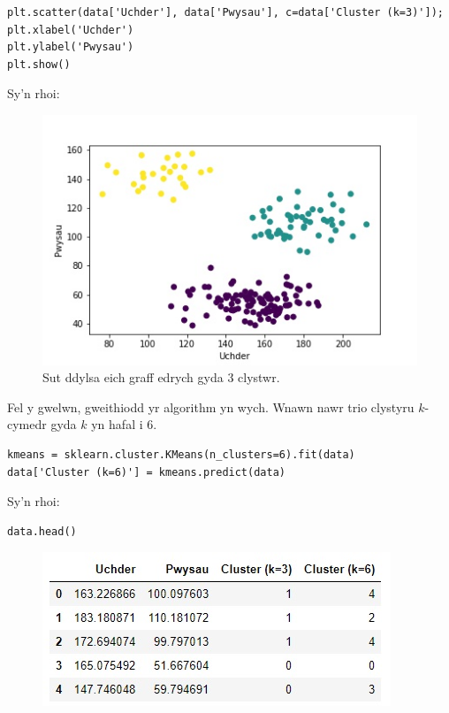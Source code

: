 \begin{verbatim}
plt.scatter(data['Uchder'], data['Pwysau'], c=data['Cluster (k=3)']);
plt.xlabel('Uchder')
plt.ylabel('Pwysau')
plt.show()
\end{verbatim}

Sy'n rhoi:

\begin{figure}[H]
\begin{center}
\includegraphics[width=0.7\linewidth]{../img/3clystwrpython.jpeg}
\caption{Sut ddylsa eich graff edrych gyda 3 clystwr.}
\label{fig:3clystwrpython}
\end{center}
\end{figure}

Fel y gwelwn, gweithiodd yr algorithm yn wych. Wnawn nawr trio clystyru $k$-cymedr gyda $k$ yn hafal i 6.

\begin{verbatim}
kmeans = sklearn.cluster.KMeans(n_clusters=6).fit(data)
data['Cluster (k=6)'] = kmeans.predict(data)
\end{verbatim}

Sy'n rhoi:

\begin{verbatim}
data.head()
\end{verbatim}

\begin{figure}[H]
\begin{center}
\includegraphics[width=0.35\linewidth]{../img/tabl3.jpg}
\end{center}
\label{fig:Data3}
\end{figure}

